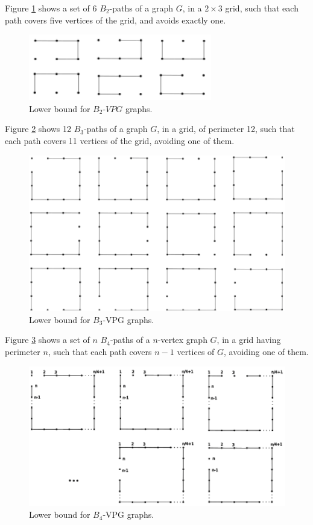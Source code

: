 Figure \ref{VPG:lower-B2} shows a set of 6 $B_2$-paths of a graph $G$, in a $2 \times 3$ grid, such that each path covers five vertices of the grid, and avoids exactly one. 


\begin{figure}[!h]
    \centering
    \includegraphics[width=8cm]{./img/lower-bound-B2-VPG.pdf}
    \caption{Lower bound for $B_2$-$VPG$ graphs.}
    \label{VPG:lower-B2}
\end{figure}


Figure \ref{VPG:lower-B3} shows 12 $B_3$-paths of a graph $G$, in a grid, of perimeter 12, such that each path covers 11  vertices of the grid,  avoiding one of them. 

\begin{figure}[!h]
    \centering
    \includegraphics[width=12cm]{./img/lower-bound-B3-VPG.pdf}
    \caption{Lower bound for $B_3$-VPG graphs.}
    \label{VPG:lower-B3}
\end{figure}

Figure \ref{VPG:lower-B4} shows a set of $n$ $B_4$-paths of a $n$-vertex graph $G$, in a grid having perimeter $n$,  such that each path covers $n-1$  vertices of $G$, avoiding one of them. 

\begin{figure}[!h]
    \centering
    \includegraphics[width=12cm]{./img/lower-bound-B4-VPG.pdf}
    \caption{Lower bound for $B_4$-VPG graphs.}
    \label{VPG:lower-B4}
\end{figure}

